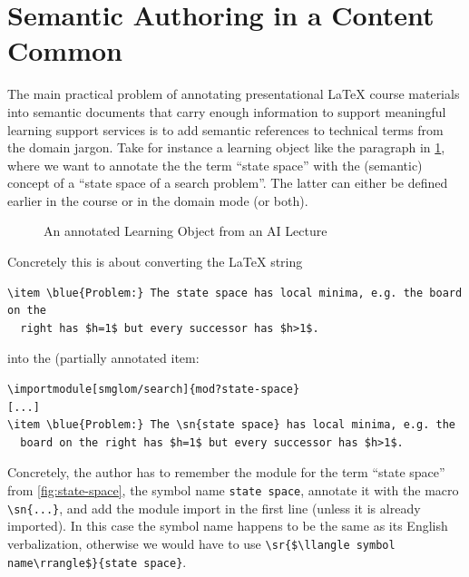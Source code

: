 \documentclass{llncs}
\def\llangle{\langle\kern-.2em\langle}
\def\rrangle{\rangle\kern-.2em\rangle}
\begin{document}
\section{Semantic Authoring in a Content Common}

The main practical problem of annotating presentational {\LaTeX} course materials into
semantic documents that carry enough information to support meaningful learning support
services is to add semantic references to technical terms from the domain jargon. Take for
instance a learning object like the paragraph in \cref{fig:lo}, where we want to annotate
the the term ``state space'' with the (semantic) concept of a ``state space of a search
problem''. The latter can either be defined earlier in the course or in the domain mode
(or both).

\begin{figure}[ht]\centering
  \caption{An annotated Learning Object from an AI Lecture}\label{fig:lo}
\end{figure}

Concretely this is about converting the {\LaTeX} string
\begin{lstlisting}[language={[LaTeX]TeX}]
\item \blue{Problem:} The state space has local minima, e.g. the board on the
  right has $h=1$ but every successor has $h>1$. 
\end{lstlisting}
into the (partially annotated item:
\begin{lstlisting}[language={[LaTeX]TeX},morekeywords={sn,importmodule}]
\importmodule[smglom/search]{mod?state-space}
[...]  
\item \blue{Problem:} The \sn{state space} has local minima, e.g. the
  board on the right has $h=1$ but every successor has $h>1$. 
\end{lstlisting}
Concretely, the author has to remember the module for the term ``state space'' from
\cref{fig:state-space}, the symbol name \lstinline|state space|, annotate it with the
\sTeX macro \lstinline|\sn{...}|, and add the module import in the first line (unless it
is already imported). In this case the symbol name happens to be the same as its English
verbalization, otherwise we would have to use
\lstinline[mathescape]|\sr{$\llangle symbol name\rrangle$}{state space}|.
\end{document}
